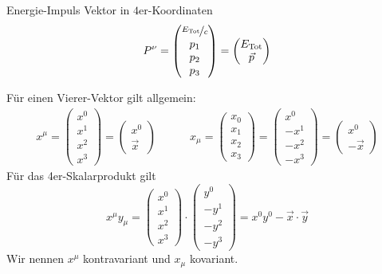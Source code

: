 Energie-Impuls Vektor in $4$er-Koordinaten
\begin{align*}
    P^{\nu} = \begin{pmatrix}
        \nicefrac{E_{\text{Tot}}}{c} \\ p_1 \\ p_2 \\ p_3
    \end{pmatrix} = \begin{pmatrix}
        E_{\text{Tot}} \\ \vec{p}
    \end{pmatrix}
\end{align*}
\begin{tcolorbox}
    Für einen Vierer-Vektor gilt allgemein:    
    \begin{align*}
        x^\mu = \begin{pmatrix}
        x^0 \\ x^1 \\ x^2\\ x^3
        \end{pmatrix} = \begin{pmatrix}
        x^0 \\ \Vec{x}
        \end{pmatrix}
        \quad \quad \quad
        x_\mu = \begin{pmatrix}
        x_0 \\ x_1 \\ x_2\\ x_3
        \end{pmatrix} = \begin{pmatrix}
        x^0 \\ -x^1 \\ -x^2\\ -x^3
        \end{pmatrix} = \begin{pmatrix}
        x^0 \\ -\Vec{x}
        \end{pmatrix}
    \end{align*}    
    Für das 4er-Skalarprodukt gilt    
    \begin{equation*}
        x^\mu y_\mu = \begin{pmatrix}
        x^0 \\ x^1 \\ x^2\\ x^3
        \end{pmatrix} \cdot \begin{pmatrix}
        y^0 \\ -y^1 \\ -y^2\\ -y^3
        \end{pmatrix} = x^0y^0 - \Vec{x}\cdot \Vec{y}
    \end{equation*}
    Wir nennen $x^{\mu}$ kontravariant und $x_{\mu}$ kovariant.
\end{tcolorbox}
